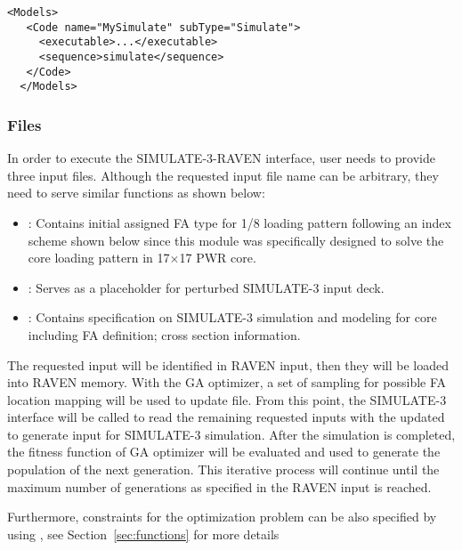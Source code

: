 \begin{lstlisting}[style=XML]
  <Models>
   <Code name="MySimulate" subType="Simulate">
     <executable>...</executable>
     <sequence>simulate</sequence>
   </Code>
  </Models>
  \end{lstlisting}

\subsubsection{Files}
In order to execute the SIMULATE-3-RAVEN interface, user needs to provide three input files. 
Although the requested input file name can be arbitrary, they need to serve similar functions as shown below:
\begin{itemize}
    \item {}: Contains initial assigned FA type for 1/8 loading pattern following an index scheme shown below since this module was specifically designed to solve the core loading pattern in 17$\times$17 PWR core. 
    \item {}: Serves as a placeholder for perturbed SIMULATE-3 input deck.
    \item {}: Contains specification on SIMULATE-3 simulation and modeling for core including FA definition; cross section information.
\end{itemize}
The requested input will be identified in RAVEN input, then they will be loaded into RAVEN memory.
With the GA optimizer, a set of sampling for possible FA location mapping 
will be used to update  file. From this point, the SIMULATE-3 interface will be called to
read the remaining requested inputs with the updated  to generate input 
for SIMULATE-3 simulation. After the simulation is completed, the fitness function of GA 
optimizer will be evaluated and used to generate the population of the next generation. 
This iterative process will continue until the maximum number of generations as specified 
in the RAVEN input is reached.

Furthermore, constraints for the optimization problem can be also specified by using  
, see Section~\ref{sec:functions} for more details

